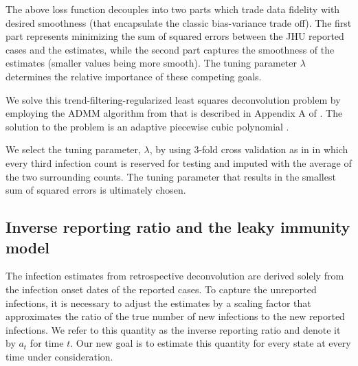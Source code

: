 \documentclass{article}
\begin{document}
The above loss function decouples into two parts which trade data fidelity with
desired smoothness (that
encapsulate the classic bias-variance trade off). The first part represents
minimizing the sum of squared errors between the JHU reported cases and the
estimates, while the second part captures the smoothness of the estimates
(smaller values being more smooth). The tuning parameter $\lambda$ determines
the relative importance of these competing goals.

We solve this trend-filtering-regularized least squares deconvolution problem by
employing the ADMM algorithm from \citet{ramdas2016fast} that is described in
Appendix A of \citet{jahja2022real}. The solution to the problem is an adaptive
piecewise cubic polynomial \citep{tibshirani2014adaptive,
tibshirani2022divided}.

We select the tuning parameter, $\lambda$, by using $3$-fold cross validation as
in \citet{jahja2022real} in which every third infection count is
reserved for testing and imputed with the average of the two surrounding counts.
The tuning parameter that results in the
smallest sum of squared errors is ultimately chosen.

\subsection{Inverse reporting ratio and the leaky immunity model} 

The infection estimates from retrospective deconvolution are
derived solely from the infection onset dates of the reported cases. 
To capture the unreported infections, it is necessary to adjust the estimates by 
a scaling factor that approximates the ratio of the true number of new infections
to the new reported infections. We refer to this quantity as the
inverse reporting ratio and denote it by $a_t$ for time $t$. Our new goal is
to estimate this quantity for every state at every time under consideration. 
\end{document}

